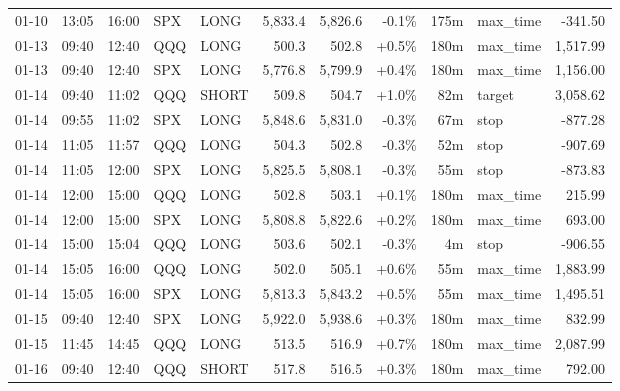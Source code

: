 \documentclass[11pt,a4paper,twoside]{article}
\begin{document}
\begin{center}
\begin{longtable}{>{\color{txtmain}}l l l l l r r r r >{\color{txtmain}}l r}
01-10 & 13:05 & 16:00 & SPX & LONG & 5,833.4 & 5,826.6 & \textcolor{lossred}{-0.1\%} & 175m & max\_time & \textcolor{lossred}{-341.50} \\
01-13 & 09:40 & 12:40 & QQQ & LONG & 500.3 & 502.8 & \textcolor{wingreen}{+0.5\%} & 180m & max\_time & \textcolor{wingreen}{1,517.99} \\
01-13 & 09:40 & 12:40 & SPX & LONG & 5,776.8 & 5,799.9 & \textcolor{wingreen}{+0.4\%} & 180m & max\_time & \textcolor{wingreen}{1,156.00} \\
01-14 & 09:40 & 11:02 & QQQ & SHORT & 509.8 & 504.7 & \textcolor{wingreen}{+1.0\%} & 82m & target & \textcolor{wingreen}{3,058.62} \\
01-14 & 09:55 & 11:02 & SPX & LONG & 5,848.6 & 5,831.0 & \textcolor{lossred}{-0.3\%} & 67m & stop & \textcolor{lossred}{-877.28} \\
01-14 & 11:05 & 11:57 & QQQ & LONG & 504.3 & 502.8 & \textcolor{lossred}{-0.3\%} & 52m & stop & \textcolor{lossred}{-907.69} \\
01-14 & 11:05 & 12:00 & SPX & LONG & 5,825.5 & 5,808.1 & \textcolor{lossred}{-0.3\%} & 55m & stop & \textcolor{lossred}{-873.83} \\
01-14 & 12:00 & 15:00 & QQQ & LONG & 502.8 & 503.1 & \textcolor{wingreen}{+0.1\%} & 180m & max\_time & \textcolor{wingreen}{215.99} \\
01-14 & 12:00 & 15:00 & SPX & LONG & 5,808.8 & 5,822.6 & \textcolor{wingreen}{+0.2\%} & 180m & max\_time & \textcolor{wingreen}{693.00} \\
01-14 & 15:00 & 15:04 & QQQ & LONG & 503.6 & 502.1 & \textcolor{lossred}{-0.3\%} & 4m & stop & \textcolor{lossred}{-906.55} \\
01-14 & 15:05 & 16:00 & QQQ & LONG & 502.0 & 505.1 & \textcolor{wingreen}{+0.6\%} & 55m & max\_time & \textcolor{wingreen}{1,883.99} \\
01-14 & 15:05 & 16:00 & SPX & LONG & 5,813.3 & 5,843.2 & \textcolor{wingreen}{+0.5\%} & 55m & max\_time & \textcolor{wingreen}{1,495.51} \\
01-15 & 09:40 & 12:40 & SPX & LONG & 5,922.0 & 5,938.6 & \textcolor{wingreen}{+0.3\%} & 180m & max\_time & \textcolor{wingreen}{832.99} \\
01-15 & 11:45 & 14:45 & QQQ & LONG & 513.5 & 516.9 & \textcolor{wingreen}{+0.7\%} & 180m & max\_time & \textcolor{wingreen}{2,087.99} \\
01-16 & 09:40 & 12:40 & QQQ & SHORT & 517.8 & 516.5 & \textcolor{wingreen}{+0.3\%} & 180m & max\_time & \textcolor{wingreen}{792.00} \\

\end{longtable}
\end{center}
\end{document}
